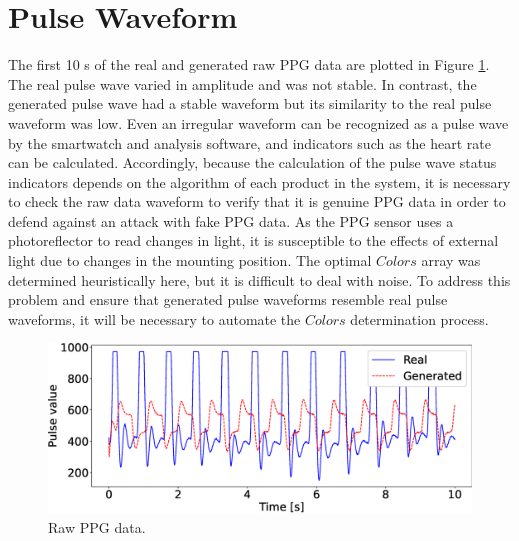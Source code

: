 \section{Pulse Waveform}
The first 10 s of the real and generated raw PPG data are plotted in Figure \ref{fig:raw_wave}. The real pulse wave varied in amplitude and was not stable. In contrast, the generated pulse wave had a stable waveform but its similarity to the real pulse waveform was low. Even an irregular waveform can be recognized as a pulse wave by the smartwatch and analysis software, and indicators such as the heart rate can be calculated. Accordingly, because the calculation of the pulse wave status indicators depends on the algorithm of each product in the system, it is necessary to check the raw data waveform to verify that it is genuine PPG data in order to defend against an attack with fake PPG data. As the PPG sensor uses a photoreflector to read changes in light, it is susceptible to the effects of external light due to changes in the mounting position. The optimal $Colors$ array was determined heuristically here, but it is difficult to deal with noise. To address this problem and ensure that generated pulse waveforms resemble real pulse waveforms, it will be necessary to automate the $Colors$ determination process.

\begin{figure}[!t]
  \centering
  \includegraphics[width=1\linewidth]{figures/raw_wave.eps}
  \caption{Raw PPG data.}
  \label{fig:raw_wave}
\end{figure}
